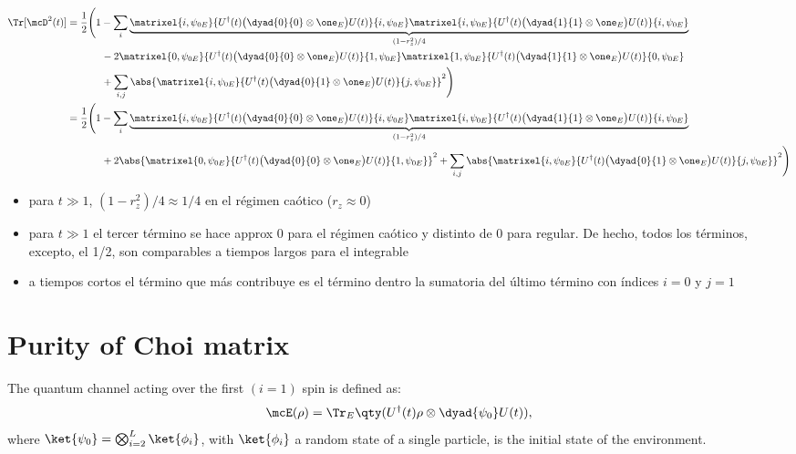 \begin{align}
\Tr[\mcD^2(t)] &= 
\frac{1}{2} 
\Bigg(
1 - 
\sum_{i}
\underbrace{
\matrixel{i, \psi_{0E}}
{U^\dagger(t) \big(\dyad{0}{0} \otimes \one_E\big) U(t)}
{i, \psi_{0E}}
\matrixel{i, \psi_{0E}}
{U^\dagger(t) \big(\dyad{1}{1} \otimes \one_E\big) U(t)}
{i, \psi_{0E}}
}_{(1 - r_z^2)/4}
\nonumber \\
& \hspace*{12mm}
- 2 \matrixel{0, \psi_{0E}}
{U^\dagger(t) \big(\dyad{0}{0} \otimes \one_E\big) U(t)}
{1, \psi_{0E}}
\matrixel{1, \psi_{0E}}
{U^\dagger(t) \big(\dyad{1}{1} \otimes \one_E\big) U(t)}
{0, \psi_{0E}}
\nonumber \\
& \hspace*{12mm}
+
\sum_{i,j}
\abs{\matrixel{i, \psi_{0E}}
{U^\dagger(t) \big(\dyad{0}{1} \otimes \one_E\big) U(t)}
{j, \psi_{0E}}
}^2
\Bigg) \\
&= \frac{1}{2} 
\Bigg(
1 - 
\sum_{i}
\underbrace{
\matrixel{i, \psi_{0E}}
{U^\dagger(t) \big(\dyad{0}{0} \otimes \one_E\big) U(t)}
{i, \psi_{0E}}
\matrixel{i, \psi_{0E}}
{U^\dagger(t) \big(\dyad{1}{1} \otimes \one_E\big) U(t)}
{i, \psi_{0E}}
}_{(1 - r_z^2)/4}
\nonumber \\
& \hspace*{12mm}
+ 2 \abs{\matrixel{0, \psi_{0E}}
{U^\dagger(t) \big(\dyad{0}{0} \otimes \one_E\big) U(t)}
{1, \psi_{0E}}
}^2
+
\sum_{i,j}
\abs{\matrixel{i, \psi_{0E}}
{U^\dagger(t) \big(\dyad{0}{1} \otimes \one_E\big) U(t)}
{j, \psi_{0E}}
}^2
\Bigg) 
\end{align}
\begin{itemize}
\item para $t\gg 1$, $(1-r_z^2)/4 \approx 1/4$ en el régimen caótico 
($r_z\approx 0$)
\item para $t \gg 1$
el tercer término se hace approx 0 para el régimen caótico y distinto de 0 
para regular. De hecho, todos los términos, excepto, el 1/2, son comparables 
a tiempos largos para el integrable
\item a tiempos cortos el término que más contribuye es el término dentro la   
sumatoria del último término con índices $i=0$ y $j=1$
\end{itemize}

\newpage

\section{Purity of Choi matrix}
The quantum channel acting over the first $(i=1)$ spin is defined as:
\begin{equation}\label{eq:choi:chaometer:channel:2}
\mcE(\rho) = 
\Tr_E \qty(
U^\dagger(t)
\rho \otimes \dyad{\psi_0}
U(t)
),
\end{equation}
where $\ket{\psi_0} = \bigotimes_{i=2}^L \ket{\phi_i}$, with $\ket{\phi_i}$
a random state of a single particle, is the initial state of the environment.

